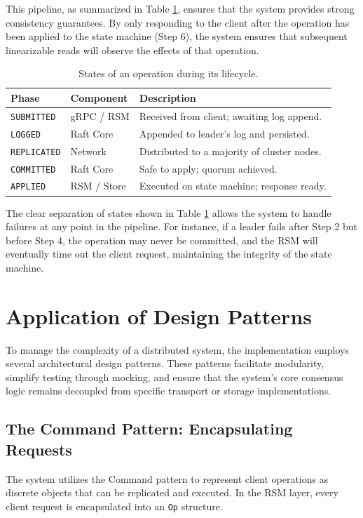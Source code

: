 This pipeline, as summarized in Table \ref{tab:operation_states}, ensures that the system provides strong consistency guarantees. By only responding to the client after the operation has been applied to the state machine (Step 6), the system ensures that subsequent linearizable reads will observe the effects of that operation.

\begin{table}[h]
\centering
\caption{States of an operation during its lifecycle.}
\label{tab:operation_states}
\begin{tabular}{|l|l|l|}
\hline
\textbf{Phase} & \textbf{Component} & \textbf{Description} \\ \hline
\texttt{SUBMITTED} & gRPC / RSM & Received from client; awaiting log append. \\ \hline
\texttt{LOGGED} & Raft Core & Appended to leader's log and persisted. \\ \hline
\texttt{REPLICATED} & Network & Distributed to a majority of cluster nodes. \\ \hline
\texttt{COMMITTED} & Raft Core & Safe to apply; quorum achieved. \\ \hline
\texttt{APPLIED} & RSM / Store & Executed on state machine; response ready. \\ \hline
\end{tabular}
\end{table}

The clear separation of states shown in Table \ref{tab:operation_states} allows the system to handle failures at any point in the pipeline. For instance, if a leader fails after Step 2 but before Step 4, the operation may never be committed, and the RSM will eventually time out the client request, maintaining the integrity of the state machine.

\section{Application of Design Patterns}
To manage the complexity of a distributed system, the implementation employs several architectural design patterns. These patterns facilitate modularity, simplify testing through mocking, and ensure that the system's core consensus logic remains decoupled from specific transport or storage implementations.

\subsection{The Command Pattern: Encapsulating Requests}
The system utilizes the Command pattern to represent client operations as discrete objects that can be replicated and executed.
In the RSM layer, every client request is encapsulated into an \texttt{Op} structure.

